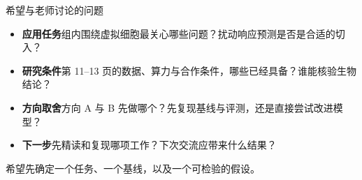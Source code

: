 \begin{frame}[t]{希望与老师讨论的问题}
\vspace{.3cm}
\begin{itemize}\setlength{\itemsep}{.33cm}
 \item[\ico{\faBullseye}] \textbf{应用任务}\quad 组内围绕虚拟细胞最关心哪些问题？扰动响应预测是否是合适的切入？
 \item[\ico{\faDatabase}] \textbf{研究条件}\quad 第 11--13 页的数据、算力与合作条件，哪些已经具备？谁能核验生物结论？
 \item[\ico{\faCodeBranch}] \textbf{方向取舍}\quad 方向 A 与 B 先做哪个？先复现基线与评测，还是直接尝试改进模型？
 \item[\ico{\faFlagCheckered}] \textbf{下一步}\quad 先精读和复现哪项工作？下次交流应带来什么结果？
\end{itemize}
\vspace{.45cm}
{\color{DarkBlue}希望先确定一个任务、一个基线，以及一个可检验的假设。}
\end{frame}
